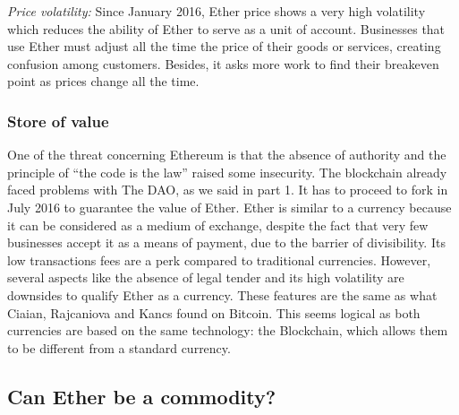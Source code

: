 \documentclass[11pt]{report}
\begin{document}
 \textit{Price volatility:} Since January 2016, Ether price shows a very high volatility which reduces the ability of Ether to serve as a unit of account. Businesses that use Ether must adjust all the time the price of their goods or services, creating confusion among customers. Besides, it asks more work to find their breakeven point as prices change all the time. \smallbreak   
 
 \subsubsection*{Store of value}
 
 One of the threat concerning Ethereum is that the absence of authority and the principle of “the code is the law” raised some insecurity. The blockchain already faced problems with The DAO, as we said in part 1. It has to proceed to fork in July 2016 to guarantee the value of Ether. \smallbreak
Ether is similar to a currency because it can be considered as a medium of exchange, despite the fact that very few businesses accept it as a means of payment, due to the barrier of divisibility. Its low transactions fees are a perk compared to traditional currencies. However, several aspects like the absence of legal tender and its high volatility are downsides to qualify Ether as a currency. These features are the same as what Ciaian, Rajcaniova and Kancs found on Bitcoin. This seems logical as both currencies are based on the same technology: the Blockchain, which allows them to be different from a standard currency.
 
	\subsection*{Can Ether be a commodity?}
	
\end{document}

